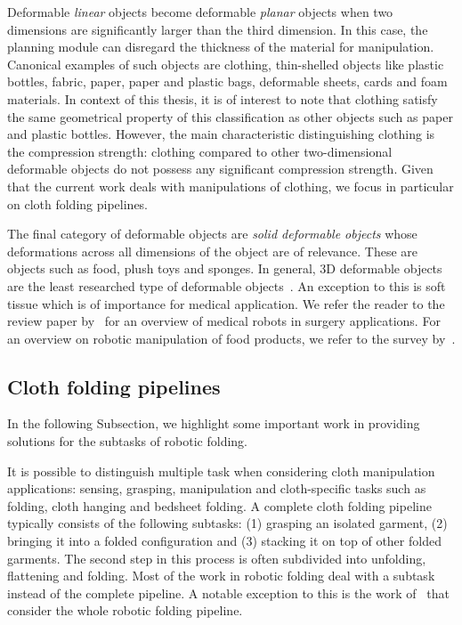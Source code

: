 \documentclass[\home/main.tex]{subfiles}
\begin{document}
Deformable \textit{linear} objects become deformable \textit{planar} objects when two dimensions are significantly larger than the third dimension. In this case, the planning module can disregard the thickness of the material for manipulation. Canonical examples of such objects are clothing, thin-shelled objects like plastic bottles, fabric, paper, paper and plastic bags, deformable sheets, cards and foam materials. In context of this thesis, it is of interest to note that clothing satisfy the same geometrical property of this classification as other objects such as paper and plastic bottles. However, the main characteristic distinguishing clothing is the compression strength: clothing compared to other two-dimensional deformable objects do not possess any significant compression strength. Given that the current work deals with manipulations of clothing, we focus in particular on cloth folding pipelines.

The final category of deformable objects are \textit{solid deformable objects} whose deformations across all dimensions of the object are of relevance. These are objects such as food, plush toys and sponges. In general, 3D deformable objects are the least researched type of deformable objects~\autocite{Sanchez2018}. An exception to this is soft tissue which is of importance for medical application. We refer the reader to the review paper by~\textcite{Taylor2016} for an overview of medical robots in surgery applications. For an overview on robotic manipulation of food products, we refer to the survey by~\textcite{Chua2003}.

\subsection{Cloth folding pipelines}
In the following Subsection, we highlight some important work in providing solutions for the subtasks of robotic folding. 

It is possible to distinguish multiple task when considering cloth manipulation applications: sensing, grasping, manipulation and cloth-specific tasks such as folding, cloth hanging and bedsheet folding. A complete cloth folding pipeline typically consists of the following subtasks: (1) grasping an isolated garment, (2) bringing it into a folded configuration and (3) stacking it on top of other folded garments. The second step in this process is often subdivided into unfolding, flattening and folding. Most of the work in robotic folding deal with a subtask instead of the complete pipeline. A notable exception to this is the work of~\textcite{Doumanoglou2016,Maitin2010} that consider the whole robotic folding pipeline.
\end{document}
